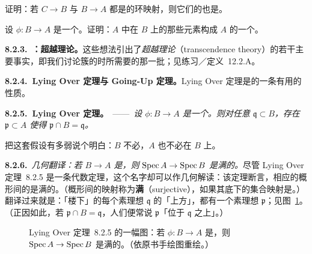 \begin{exercise}\label{ex:integrality-composition}
证明：若 $C\to B$ 与 $B\to A$ 都是\trIntegral{}的环映射，则它们的\trComposition{}也是。
\end{exercise}

\begin{exercise}\label{ex:integral-elements-subalgebra}
设 $\phi\colon B\to A$ 是一个\trRingMorphism。证明：$A$ 中在 $B$ 上\trIntegral{}的那些元素构成 $A$ 的一个\trSubalgebra{}。
\end{exercise}

\textbf{8.2.3.\ \trhRemark{}：超越理论。}\quad 这些想法引出了\emph{超越理论}（transcendence theory）的若干主要事实，即我们讨论簇的\trDimension{}时所需要的那一批；见练习／定义~12.2.A。%

\textbf{8.2.4.\ Lying Over 定理与 Going-Up 定理。}\quad Lying Over 定理是\trIntegralExtension{}的一条有用的性质。

\textbf{8.2.5.\ Lying Over 定理。}\ ——\ \emph{设 $\phi\colon B\to A$ 是一个\trIntegralExtension{}。则对任意\trPrimeIdeal{} $\mathfrak{q}\subset B$，存在\trPrimeIdeal{} $\mathfrak{p}\subset A$ 使得 $\mathfrak{p}\cap B=\mathfrak{q}$。}

把这套假设有多弱说个明白：$B$ 不必\trNoetherian，$A$ 也不必在 $B$ 上\trFinitelyGenerated。

\textbf{8.2.6.}\ \emph{几何翻译：若 $B\to A$ 是\trIntegralExtension{}，则 $\operatorname{Spec} A\to\operatorname{Spec} B$ 是满的。}\quad 尽管 Lying Over 定理~8.2.5 是一条代数定理，这个名字却可以作几何解读：该定理断言，相应的概形间的\trMorphism{}是满的。（概形间的映射称为\textbf{满}（surjective），如果其底下的集合映射是\trSurjectiveMap。）%
翻译过来就是：「楼下」的每个素理想 $\mathfrak{q}$ 的「上方」，都有一个素理想 $\mathfrak{p}$；见图~\ref{fig:lying-over-picture}。（正因如此，若 $\mathfrak{p}\cap B=\mathfrak{q}$，人们便常说 $\mathfrak{p}$「位于 $\mathfrak{q}$ 之上」。）

\begin{figure}[htbp]
\centering
{}
\caption{Lying Over 定理~8.2.5 的一幅图：若 $\phi\colon B\to A$ 是\trIntegralExtension{}，则 $\operatorname{Spec} A\to\operatorname{Spec} B$ 是满的。（依原书手绘图重绘。）}\label{fig:lying-over-picture}
\end{figure}


